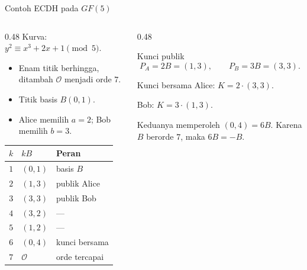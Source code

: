 \documentclass[aspectratio=169,11pt]{beamer}
\begin{document}
\begin{frame}{Contoh ECDH pada $GF(5)$}
    \begin{columns}[T,onlytextwidth]
        \begin{column}{0.48\textwidth}
            \footnotesize
            Kurva: $y^2 \equiv x^3 + 2x + 1 \pmod 5$.
            \begin{itemize}
                \item Enam titik berhingga, ditambah $\mathcal{O}$ menjadi
                      orde $7$.
                \item Titik basis $B(0,1)$.
                \item Alice memilih $a=2$; Bob memilih $b=3$.
            \end{itemize}
            \vspace{0.1cm}
            \begin{tabular}{@{}c l l@{}}
                \toprule
                $k$ & $kB$ & Peran \\
                \midrule
                $1$ & $(0,1)$ & basis $B$ \\
                $2$ & $(1,3)$ & publik Alice \\
                $3$ & $(3,3)$ & publik Bob \\
                $4$ & $(3,2)$ & --- \\
                $5$ & $(1,2)$ & --- \\
                $6$ & $(0,4)$ & kunci bersama \\
                $7$ & $\mathcal{O}$ & orde tercapai \\
                \bottomrule
            \end{tabular}
        \end{column}
        \begin{column}{0.48\textwidth}
            \begin{block}{Kunci publik}
                \footnotesize
                \[
                    P_A = 2B = (1,3), \qquad
                    P_B = 3B = (3,3) .
                \]
            \end{block}
            \begin{exampleblock}{Kunci bersama}
                \footnotesize
                Alice: $K = 2 \cdot (3,3)$.

                Bob: $K = 3 \cdot (1,3)$.

                Keduanya memperoleh $(0,4) = 6B$. Karena $B$ berorde $7$,
                maka $6B = -B$.
            \end{exampleblock}
        \end{column}
    \end{columns}
\end{frame}
\end{document}
